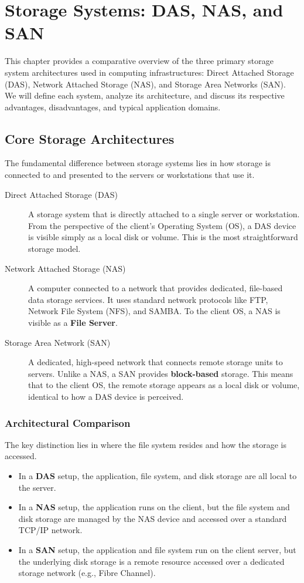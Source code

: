 \chapter{Storage Systems: DAS, NAS, and SAN}

This chapter provides a comparative overview of the three primary storage system architectures used in computing infrastructures: Direct Attached Storage (DAS), Network Attached Storage (NAS), and Storage Area Networks (SAN). We will define each system, analyze its architecture, and discuss its respective advantages, disadvantages, and typical application domains.

\section{Core Storage Architectures}
The fundamental difference between storage systems lies in how storage is connected to and presented to the servers or workstations that use it.

\begin{description}
    \item[Direct Attached Storage (DAS)] A storage system that is directly attached to a single server or workstation. From the perspective of the client's Operating System (OS), a DAS device is visible simply as a local disk or volume. This is the most straightforward storage model.
    \item[Network Attached Storage (NAS)] A computer connected to a network that provides dedicated, file-based data storage services. It uses standard network protocols like FTP, Network File System (NFS), and SAMBA. To the client OS, a NAS is visible as a \textbf{File Server}.
    \item[Storage Area Network (SAN)] A dedicated, high-speed network that connects remote storage units to servers. Unlike a NAS, a SAN provides \textbf{block-based} storage. This means that to the client OS, the remote storage appears as a local disk or volume, identical to how a DAS device is perceived.
\end{description}

\subsection{Architectural Comparison}
The key distinction lies in where the file system resides and how the storage is accessed.
\begin{itemize}
    \item In a \textbf{DAS} setup, the application, file system, and disk storage are all local to the server.
    \item In a \textbf{NAS} setup, the application runs on the client, but the file system and disk storage are managed by the NAS device and accessed over a standard TCP/IP network.
    \item In a \textbf{SAN} setup, the application and file system run on the client server, but the underlying disk storage is a remote resource accessed over a dedicated storage network (e.g., Fibre Channel).
\end{itemize}

